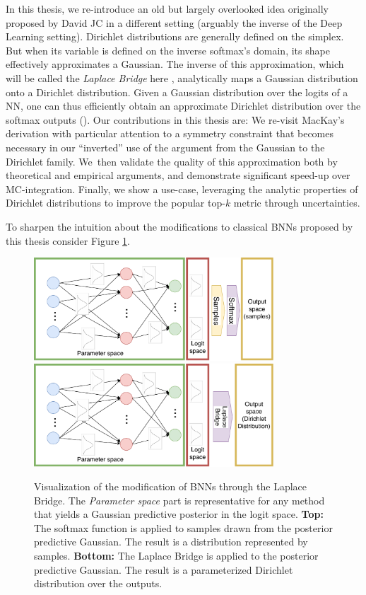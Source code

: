 In this thesis, we re-introduce an old but largely overlooked idea originally proposed by David JC \citet{MacKay1998} in a different setting (arguably the inverse of the Deep Learning setting). Dirichlet distributions are generally defined on the simplex. But when its variable is defined on the inverse softmax's domain, its shape effectively approximates a Gaussian. The inverse of this approximation, which will be called the \emph{Laplace Bridge} here \citep{KernelTopicModels2012}, analytically maps a Gaussian distribution onto a Dirichlet distribution. Given a Gaussian distribution over the logits of a NN, one can thus efficiently obtain an approximate Dirichlet distribution over the softmax outputs (). Our contributions in this thesis are: We re-visit MacKay's derivation with particular attention to a symmetry constraint that becomes necessary in our ``inverted'' use of the argument from the Gaussian to the Dirichlet family. We then validate the quality of this approximation both by theoretical and empirical arguments, and demonstrate significant speed-up over MC-integration. Finally, we show a use-case, leveraging the analytic properties of Dirichlet distributions to improve the popular top-$k$ metric through uncertainties.

To sharpen the intuition about the modifications to classical BNNs proposed by this thesis consider Figure \ref{fig:LaplaceBridge_intuition}.

\begin{figure}[htb]
	\centering
	\includegraphics[width=0.8\textwidth]{figures/GaussNN_classic.pdf} \\
	\includegraphics[width=0.8\textwidth]{figures/GaussNN_LaplaceBridge.pdf} \\
	\caption{Visualization of the modification of BNNs through the Laplace Bridge. The \textit{Parameter space} part is representative for any method that yields a Gaussian predictive posterior in the logit space. \textbf{Top:} The softmax function is applied to samples drawn from the posterior predictive Gaussian. The result is a distribution represented by samples. \textbf{Bottom:} The Laplace Bridge is applied to the posterior predictive Gaussian. The result is a parameterized Dirichlet distribution over the outputs.}
	\label{fig:LaplaceBridge_intuition}
\end{figure}

